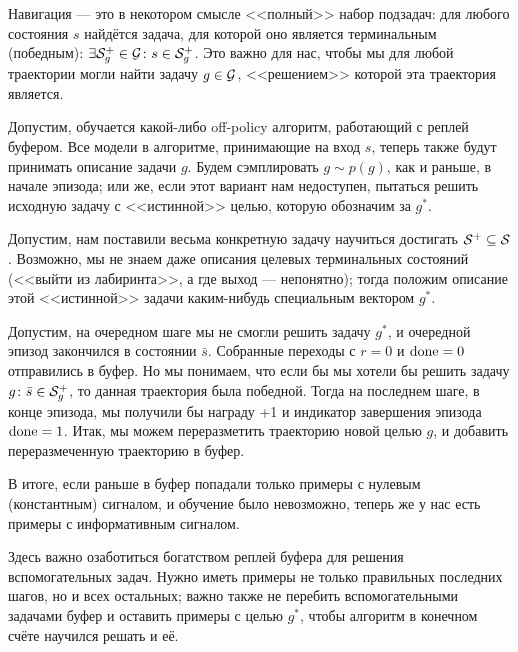 Навигация --- это в некотором смысле <<полный>> набор подзадач: для любого состояния $s$ найдётся задача, для которой оно является терминальным (победным): $\exists \mathcal{S}^+_g \in \mathcal{G} \colon s \in \mathcal{S}^+_g$. Это важно для нас, чтобы мы для любой траектории могли найти задачу $g \HM\in \G$, <<решением>> которой эта траектория является.

Допустим, обучается какой-либо off-policy алгоритм, работающий с реплей буфером. Все модели в алгоритме, принимающие на вход $s$, теперь также будут принимать описание задачи $g$. Будем сэмплировать $g \sim p(g)$, как и раньше, в начале эпизода; или же, если этот вариант нам недоступен, пытаться решить исходную задачу с <<истинной>> целью, которую обозначим за $g^*$. 

\begin{remark}
Допустим, нам поставили весьма конкретную задачу научиться достигать $\mathcal{S}^+ \subseteq \mathcal{S}$. Возможно, мы не знаем даже описания целевых терминальных состояний (<<выйти из лабиринта>>, а где выход --- непонятно); тогда положим описание этой <<истинной>> задачи каким-нибудь специальным вектором $g^*$.
\end{remark}

\begin{figure}
\vspace{-0.4cm}
\centering
{}
\vspace{-0.5cm}
\end{figure}

Допустим, на очередном шаге мы не смогли решить задачу $g^*$, и очередной эпизод закончился в состоянии $\bar{s}$. Собранные переходы с $r = 0$ и $\mathrm{done} = 0$ отправились в буфер. Но мы понимаем, что если бы мы хотели бы решить задачу $g \colon \bar{s} \in \mathcal{S}^+_g$, то данная траектория была победной. Тогда на последнем шаге, в конце эпизода, мы получили бы награду +1 и индикатор завершения эпизода $\mathrm{done} = 1$. Итак, мы можем переразметить траекторию новой целью $g$, и добавить переразмеченную траекторию в буфер.

В итоге, если раньше в буфер попадали только примеры с нулевым (константным) сигналом, и обучение было невозможно, теперь же у нас есть примеры с информативным сигналом.  

Здесь важно озаботиться богатством реплей буфера для решения вспомогательных задач. Нужно иметь примеры не только правильных последних шагов, но и всех остальных; важно также не перебить вспомогательными задачами буфер и оставить примеры с целью $g^*$, чтобы алгоритм в конечном счёте научился решать и её.

